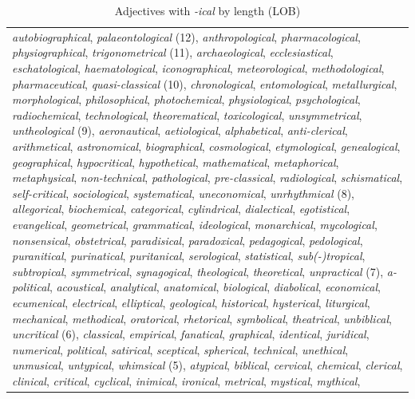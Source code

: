 \begin{table}\footnotesize
\caption{Adjectives with \textit{-ical} by length (LOB) \label{tab:icallength}}
\begin{tabularx}{\textwidth}{Q}
\lsptoprule
\textit{autobiographical}, \textit{palaeontological} (12), \textit{anthropological}, \textit{pharmacological}, \textit{physiographical}, \textit{trigonometrical} (11), \textit{archaeological}, \textit{ecclesiastical}, \textit{eschatological}, \textit{haematological}, \textit{iconographical}, \textit{meteorological}, \textit{methodological}, \textit{pharmaceutical}, \textit{quasi-classical} (10), \textit{chronological}, \textit{entomological}, \textit{metallurgical}, \textit{morphological}, \textit{philosophical}, \textit{photochemical}, \textit{physiological}, \textit{psychological}, \textit{radiochemical}, \textit{technological}, \textit{theorematical}, \textit{toxicological}, \textit{unsymmetrical}, \textit{untheological} (9), \textit{aeronautical}, \textit{aetiological}, \textit{alphabetical}, \textit{anti-clerical}, \textit{arithmetical}, \textit{astronomical}, \textit{biographical}, \textit{cosmological}, \textit{etymological}, \textit{genealogical}, \textit{geographical}, \textit{hypocritical}, \textit{hypothetical}, \textit{mathematical}, \textit{metaphorical}, \textit{metaphysical}, \textit{non-technical}, \textit{pathological}, \textit{pre-classical}, \textit{radiological}, \textit{schismatical}, \textit{self-critical}, \textit{sociological}, \textit{systematical}, \textit{uneconomical}, \textit{unrhythmical} (8), \textit{allegorical}, \textit{biochemical}, \textit{categorical}, \textit{cylindrical}, \textit{dialectical}, \textit{egotistical}, \textit{evangelical}, \textit{geometrical}, \textit{grammatical}, \textit{ideological}, \textit{monarchical}, \textit{mycological}, \textit{nonsensical}, \textit{obstetrical}, \textit{paradisical}, \textit{paradoxical}, \textit{pedagogical}, \textit{pedological}, \textit{puranitical}, \textit{purinatical}, \textit{puritanical}, \textit{serological}, \textit{statistical}, \textit{sub(-)tropical}, \textit{subtropical}, \textit{symmetrical}, \textit{synagogical}, \textit{theological}, \textit{theoretical}, \textit{unpractical} (7), \textit{a-political}, \textit{acoustical}, \textit{analytical}, \textit{anatomical}, \textit{biological}, \textit{diabolical}, \textit{economical}, \textit{ecumenical}, \textit{electrical}, \textit{elliptical}, \textit{geological}, \textit{historical}, \textit{hysterical}, \textit{liturgical}, \textit{mechanical}, \textit{methodical}, \textit{oratorical}, \textit{rhetorical}, \textit{symbolical}, \textit{theatrical}, \textit{unbiblical}, \textit{uncritical} (6), \textit{classical}, \textit{empirical}, \textit{fanatical}, \textit{graphical}, \textit{identical}, \textit{juridical}, \textit{numerical}, \textit{political}, \textit{satirical}, \textit{sceptical}, \textit{spherical}, \textit{technical}, \textit{unethical}, \textit{unmusical}, \textit{untypical}, \textit{whimsical} (5), \textit{atypical}, \textit{biblical}, \textit{cervical}, \textit{chemical}, \textit{clerical}, \textit{clinical}, \textit{critical}, \textit{cyclical}, \textit{inimical}, \textit{ironical}, \textit{metrical}, \textit{mystical}, \textit{mythical}, 
\end{tabularx}
\end{table}
